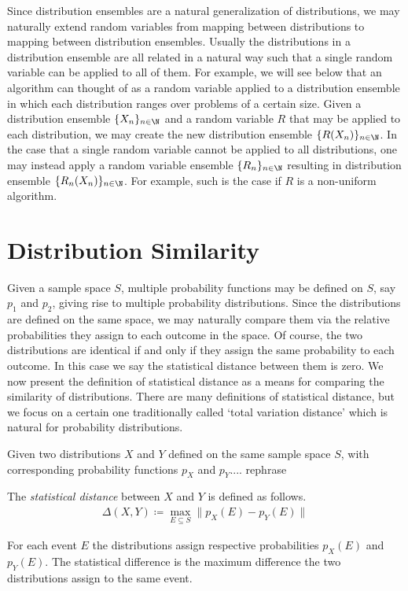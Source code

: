 Since distribution ensembles are a natural generalization of distributions, we may naturally extend random variables from mapping between distributions to mapping between distribution ensembles.
Usually the distributions in a distribution ensemble are all related in a natural way such that a single random variable can be applied to all of them. 
For example, we will see below that an algorithm can thought of as a random variable applied to a distribution ensemble in which each distribution ranges over problems of a certain size.
Given a distribution ensemble $\{X_n\}_{n\in\N}$ and a random variable $R$ that may be applied to each distribution, we may create the new distribution ensemble $\{R(X_n)\}_{n\in\N}$.
In the case that a single random variable cannot be applied to all distributions, one may instead apply a random variable ensemble $\{R_n\}_{n\in\N}$ resulting in distribution ensemble $\{R_n(X_n)\}_{n\in\N}$.
For example, such is the case if $R$ is a non-uniform algorithm.


\section{Distribution Similarity}

Given a sample space $S$, multiple probability functions may be defined on $S$, say $p_1$ and $p_2$, giving rise to multiple probability distributions.
Since the distributions are defined on the same space, we may naturally compare them via the relative probabilities they assign to each outcome in the space.
Of course, the two distributions are identical if and only if they assign the same probability to each outcome.
In this case we say the statistical distance between them is zero.
We now present the definition of statistical distance as a means for comparing the similarity of distributions.
There are many definitions of statistical distance, but we focus on a certain one traditionally called `total variation distance' which is natural for probability distributions.

\begin{definition}
    Given two distributions $X$ and $Y$ defined on the same sample space $S$, with corresponding probability functions $p_X$ and $p_Y$.... rephrase

    The \emph{statistical distance} between $X$ and $Y$ is defined as follows.
    \begin{align}
        \Delta(X,Y) \coloneqq \max_{E\subseteq S} \|p_X(E) - p_Y(E)\|
    \end{align}
    
    For each event $E$ the distributions assign respective probabilities $p_X(E)$ and $p_Y(E)$.
    The statistical difference is the maximum difference the two distributions assign to the same event.
\end{definition}

